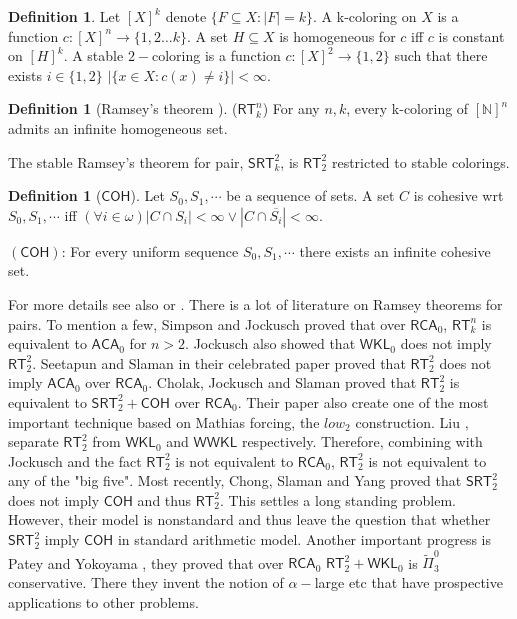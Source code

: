 \documentclass[options]{amsart}
\theoremstyle{definition}
\newtheorem{definition}[theorem]{Definition}
\theoremstyle{remark}
\newtheorem{Ramsey's theorem}[theorem]{Ramsey's theorem}
\begin{document}
\begin{definition}
Let $[X]^k$ denote $\{F\subseteq X: |F|=k\}$.
A k-coloring on $X$
is a function $c: [X]^n\rightarrow \{1,2\ldots k\}$.
A
set $H\subseteq X$ is homogeneous for $c$
iff $c$ is constant on $[H]^k$.
A stable $2-$coloring is a function
$c: [X]^2\rightarrow \{1,2\}$
such that there exists $i\in\{1,2\}$
$|\{x\in X: c(x)\ne i\}|<\infty$.
\end{definition}

\begin{definition}[Ramsey's theorem \cite{ramsey1930problem}]
 ($\mathsf{RT}_k^n$) For any $n,k$, every k-coloring of $[\mathbb{N}]^n$
 admits an infinite homogeneous set.

 The stable Ramsey's theorem
 for pair, $\mathsf{SRT}_k^2$, is $\mathsf{RT}_2^2$
 restricted to stable colorings.
\end{definition}

 \begin{definition}[$\mathsf{COH}$]
Let $S_0,S_1,\cdots$ be a sequence of
sets. A set $C$
 is cohesive wrt $S_0,S_1,\cdots$ iff
 $(\forall i\in\omega) |C\cap S_i|<\infty\vee
 |C\cap \overline{S_i}|<\infty  $.

$(\mathsf{COH})$: For every
uniform sequence $S_0,S_1,\cdots$
there exists an infinite cohesive
set.

 \end{definition}
 For more
details see also \cite{Cholak2001} or
\cite{hirschfeldt2014slicing}.
There is a lot of literature
on Ramsey theorems for pairs.
To mention a few,
Simpson \cite{simpson1999subsystems}
and Jockusch \cite{jockusch1972ramsey}
proved that over
$\mathsf{RCA}_0$,
 $\mathsf{RT}_k^n$ is equivalent to
 $\mathsf{ACA}_0$ for $n>2$.
 Jockusch \cite{jockusch1972ramsey}
 also showed that $\mathsf{WKL}_0$ does
 not imply $\mathsf{RT}_2^2$.
 Seetapun and Slaman
 in their celebrated paper
 \cite{seetapun1995strength}
   proved that
 $\mathsf{RT}_2^2$ does not imply
 $\mathsf{ACA}_0$ over $\mathsf{RCA}_0$.
 Cholak, Jockusch and Slaman \cite{Cholak2001}
 proved that $\mathsf{RT}_2^2$ is equivalent
 to $\mathsf{SRT}_2^2+\mathsf{COH}$
 over $\mathsf{RCA}_0$. Their paper also
 create one of the most important technique
 based on Mathias forcing,
 the $low_2$ construction.
 Liu \cite{liu2012rt},\cite{liu2015cone}
 separate $\mathsf{RT}_2^2$ from
 $\mathsf{WKL}_0$ and $\mathsf{WWKL}$
 respectively. Therefore, combining
 with Jockusch  \cite{jockusch1972ramsey}
 and the fact $\mathsf{RT}_2^2$ is not
 equivalent to $\mathsf{RCA}_0$,
 $\mathsf{RT}_2^2$ is not equivalent to
 any of the "big five". Most recently,
 Chong, Slaman and Yang \cite{chong2014metamathematics}
 proved that $\mathsf{SRT}_2^2$
 does not imply $\mathsf{COH}$ and thus
  $\mathsf{RT}_2^2$. This settles a long standing problem.
  However, their model is nonstandard and thus leave
  the question that whether $\mathsf{SRT}_2^2$
  imply $\mathsf{COH}$ in standard arithmetic model.
 Another important progress is Patey and
 Yokoyama \cite{patey2016proof},
 they proved that over $\mathsf{RCA}_0$
 $\mathsf{RT}_2^2+\mathsf{WKL}_0$ is
 $\tilde{\Pi}_3^0$ conservative. There they
invent the notion of $\alpha-$large
 etc that have prospective applications
 to other problems.
\end{document}
